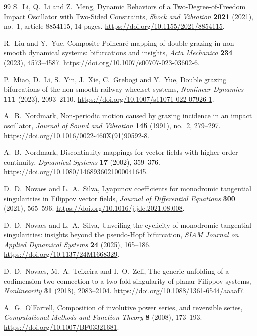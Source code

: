 \begin{thebibliography}{99}
S.~Li, Q.~Li and Z.~Meng,
Dynamic Behaviors of a Two-Degree-of-Freedom Impact Oscillator
with Two-Sided Constraints,
\emph{Shock and Vibration}
\textbf{2021} (2021), no.~1, article 8854115, 14 pages.
\url{https://doi.org/10.1155/2021/8854115}.

R.~Liu and Y.~Yue,
Composite Poincar\'e mapping of double grazing in non-smooth
dynamical systems: bifurcations and insights,
\emph{Acta Mechanica} \textbf{234} (2023), 4573--4587.
\url{https://doi.org/10.1007/s00707-023-03602-6}.

P.~Miao, D.~Li, S.~Yin, J.~Xie, C.~Grebogi and Y.~Yue,
Double grazing bifurcations of the non-smooth railway wheelset systems,
\emph{Nonlinear Dynamics} \textbf{111} (2023), 2093--2110.
\url{https://doi.org/10.1007/s11071-022-07926-1}.

A.~B.~Nordmark,
Non-periodic motion caused by grazing incidence in an impact oscillator,
\emph{Journal of Sound and Vibration} \textbf{145} (1991), no.~2, 279--297.
\url{https://doi.org/10.1016/0022-460X(91)90592-8}.

A.~B.~Nordmark,
Discontinuity mappings for vector fields with higher order continuity,
\emph{Dynamical Systems} \textbf{17} (2002), 359--376.
\url{https://doi.org/10.1080/1468936021000041645}.

D.~D.~Novaes and L.~A.~Silva,
Lyapunov coefficients for monodromic tangential singularities in
Filippov vector fields,
\emph{Journal of Differential Equations} \textbf{300} (2021), 565--596.
\url{https://doi.org/10.1016/j.jde.2021.08.008}.

D.~D.~Novaes and L.~A.~Silva,
Unveiling the cyclicity of monodromic tangential singularities:
insights beyond the pseudo-Hopf bifurcation,
\emph{SIAM Journal on Applied Dynamical Systems}
\textbf{24} (2025), 165--186.
\url{https://doi.org/10.1137/24M1668329}.

D.~D.~Novaes, M.~A.~Teixeira and I.~O.~Zeli,
The generic unfolding of a codimension-two connection to a two-fold
singularity of planar Filippov systems,
\emph{Nonlinearity} \textbf{31} (2018), 2083--2104.
\url{https://doi.org/10.1088/1361-6544/aaaaf7}.

A.~G.~O'Farrell,
Composition of involutive power series, and reversible series,
\emph{Computational Methods and Function Theory}
\textbf{8} (2008), 173--193.
\url{https://doi.org/10.1007/BF03321681}.


\end{thebibliography}

